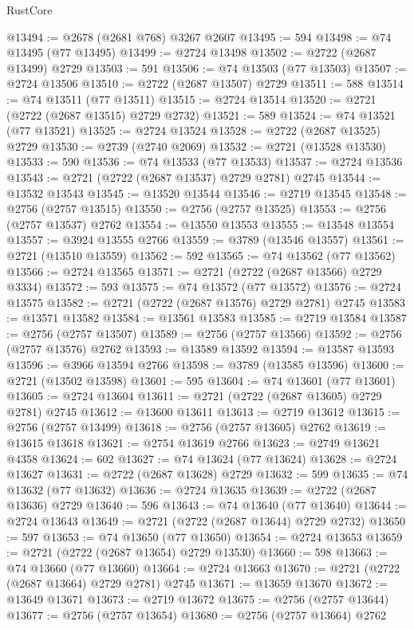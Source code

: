 \begin{lexlean}{RustCore}
\begin{coremodule}
@13494 := @2678 (@2681 @768) @3267 @2607
@13495 := 594
@13498 := @74 @13495 (@77 @13495)
@13499 := @2724 @13498
@13502 := @2722 (@2687 @13499) @2729
@13503 := 591
@13506 := @74 @13503 (@77 @13503)
@13507 := @2724 @13506
@13510 := @2722 (@2687 @13507) @2729
@13511 := 588
@13514 := @74 @13511 (@77 @13511)
@13515 := @2724 @13514
@13520 := @2721 (@2722 (@2687 @13515) @2729 @2732)
@13521 := 589
@13524 := @74 @13521 (@77 @13521)
@13525 := @2724 @13524
@13528 := @2722 (@2687 @13525) @2729
@13530 := @2739 (@2740 @2069)
@13532 := @2721 (@13528 @13530)
@13533 := 590
@13536 := @74 @13533 (@77 @13533)
@13537 := @2724 @13536
@13543 := @2721 (@2722 (@2687 @13537) @2729 @2781) @2745
@13544 := @13532 @13543
@13545 := @13520 @13544
@13546 := @2719 @13545
@13548 := @2756 (@2757 @13515)
@13550 := @2756 (@2757 @13525)
@13553 := @2756 (@2757 @13537) @2762
@13554 := @13550 @13553
@13555 := @13548 @13554
@13557 := @3924 @13555 @2766
@13559 := @3789 (@13546 @13557)
@13561 := @2721 (@13510 @13559)
@13562 := 592
@13565 := @74 @13562 (@77 @13562)
@13566 := @2724 @13565
@13571 := @2721 (@2722 (@2687 @13566) @2729 @3334)
@13572 := 593
@13575 := @74 @13572 (@77 @13572)
@13576 := @2724 @13575
@13582 := @2721 (@2722 (@2687 @13576) @2729 @2781) @2745
@13583 := @13571 @13582
@13584 := @13561 @13583
@13585 := @2719 @13584
@13587 := @2756 (@2757 @13507)
@13589 := @2756 (@2757 @13566)
@13592 := @2756 (@2757 @13576) @2762
@13593 := @13589 @13592
@13594 := @13587 @13593
@13596 := @3966 @13594 @2766
@13598 := @3789 (@13585 @13596)
@13600 := @2721 (@13502 @13598)
@13601 := 595
@13604 := @74 @13601 (@77 @13601)
@13605 := @2724 @13604
@13611 := @2721 (@2722 (@2687 @13605) @2729 @2781) @2745
@13612 := @13600 @13611
@13613 := @2719 @13612
@13615 := @2756 (@2757 @13499)
@13618 := @2756 (@2757 @13605) @2762
@13619 := @13615 @13618
@13621 := @2754 @13619 @2766
@13623 := @2749 @13621 @4358
@13624 := 602
@13627 := @74 @13624 (@77 @13624)
@13628 := @2724 @13627
@13631 := @2722 (@2687 @13628) @2729
@13632 := 599
@13635 := @74 @13632 (@77 @13632)
@13636 := @2724 @13635
@13639 := @2722 (@2687 @13636) @2729
@13640 := 596
@13643 := @74 @13640 (@77 @13640)
@13644 := @2724 @13643
@13649 := @2721 (@2722 (@2687 @13644) @2729 @2732)
@13650 := 597
@13653 := @74 @13650 (@77 @13650)
@13654 := @2724 @13653
@13659 := @2721 (@2722 (@2687 @13654) @2729 @13530)
@13660 := 598
@13663 := @74 @13660 (@77 @13660)
@13664 := @2724 @13663
@13670 := @2721 (@2722 (@2687 @13664) @2729 @2781) @2745
@13671 := @13659 @13670
@13672 := @13649 @13671
@13673 := @2719 @13672
@13675 := @2756 (@2757 @13644)
@13677 := @2756 (@2757 @13654)
@13680 := @2756 (@2757 @13664) @2762

\end{coremodule}
\end{lexlean}
